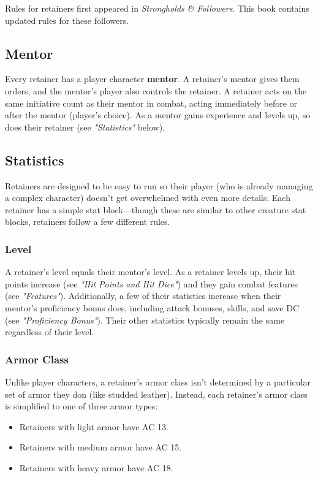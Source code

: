 \documentclass[10pt,a4paper,twoside,bg=print,twocolumn,openany,nodeprecatedcode]{dndbook}
\begin{document}
Rules for retainers first appeared in \textit{Strongholds \& Followers}. This book contains updated rules for these followers.

\subsection{Mentor}
Every retainer has a player character \textbf{mentor}. A retainer's mentor gives them orders, and the mentor's player also controls the retainer. A retainer acts on the same initiative count as their mentor in combat, acting immediately before or after the mentor (player's choice). As a mentor gains experience and levels up, so does their retainer (see \textit{"Statistics"} below).

\subsection{Statistics}
Retainers are designed to be easy to run so their player (who is already managing a complex character) doesn't get overwhelmed with even more details. Each retainer has a simple stat block—though these are similar to other creature stat blocks, retainers follow a few different rules.

\subsubsection{Level}
A retainer's level equals their mentor's level. As a retainer levels up, their hit points increase (see \textit{"Hit Points and Hit Dice"}) and they gain combat features (see \textit{"Features"}). Additionally, a few of their statistics increase when their mentor's proficiency bonus does, including attack bonuses, skills, and save DC (see \textit{"Proficiency Bonus"}). Their other statistics typically remain the same regardless of their level.

\subsubsection{Armor Class}
Unlike player characters, a retainer's armor class isn't determined by a particular set of armor they don (like studded leather). Instead, each retainer's armor class is simplified to one of three armor types:


\begin{itemize}
\item Retainers with light armor have AC 13.
\item Retainers with medium armor have AC 15.
\item Retainers with heavy armor have AC 18.
\end{itemize}
\end{document}
